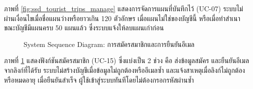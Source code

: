 ภาพที่ \ref{fig:ssd_tourist_trips_manage} แสดงการจัดการแผนที่บันทึกไว้ (UC-07) ระบบไม่ผ่านเงื่อนไขเมื่อชื่อแผนว่างหรือยาวเกิน 120 ตัวอักษร เมื่อแผนไม่ใช่ของบัญชีนี้ หรือเมื่อทำสำเนาขณะบัญชีมีแผนครบ 50 แผนแล้ว ซึ่งระบบแจ้งให้ลบแผนเก่าก่อน


\begin{figure}[H]
\centering
{}
\caption{System Sequence Diagram: การสมัครสมาชิกและการยืนยันอีเมล}
\label{fig:ssd_tourist_auth}
\end{figure}

ภาพที่ \ref{fig:ssd_tourist_auth} แสดงฟังก์ชันสมัครสมาชิก (UC-15) ซึ่งแบ่งเป็น 2 ช่วง คือ ส่งข้อมูลสมัคร และยืนยันอีเมลจากลิงก์ที่ได้รับ ระบบไม่สร้างบัญชีเมื่อข้อมูลไม่ถูกต้องหรืออีเมลซ้ำ และแจ้งสาเหตุเมื่อลิงก์ไม่ถูกต้องหรือหมดอายุ เมื่อยืนยันสำเร็จ ผู้ใช้เข้าสู่ระบบทันทีโดยไม่ต้องกรอกรหัสผ่านซ้ำ

